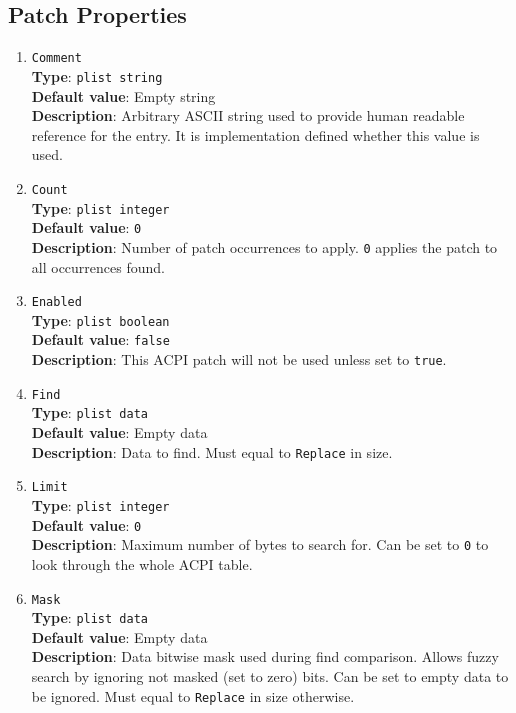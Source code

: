 \documentclass[]{article}
\begin{document}
\subsection{Patch Properties}\label{acpipropspatch}

\begin{enumerate}

\item
  \texttt{Comment}\\
  \textbf{Type}: \texttt{plist\ string}\\
  \textbf{Default value}: Empty string\\
  \textbf{Description}: Arbitrary ASCII string used to provide human readable
  reference for the entry. It is implementation defined whether this value is
  used.

\item
  \texttt{Count}\\
  \textbf{Type}: \texttt{plist\ integer}\\
  \textbf{Default value}: \texttt{0}\\
  \textbf{Description}: Number of patch occurrences to apply. \texttt{0} applies
  the patch to all occurrences found.

\item
  \texttt{Enabled}\\
  \textbf{Type}: \texttt{plist\ boolean}\\
  \textbf{Default value}: \texttt{false}\\
  \textbf{Description}: This ACPI patch will not be used unless set to
  \texttt{true}.

\item
  \texttt{Find}\\
  \textbf{Type}: \texttt{plist\ data}\\
  \textbf{Default value}: Empty data\\
  \textbf{Description}: Data to find. Must equal to \texttt{Replace} in size.

\item
  \texttt{Limit}\\
  \textbf{Type}: \texttt{plist\ integer}\\
  \textbf{Default value}: \texttt{0}\\
  \textbf{Description}: Maximum number of bytes to search for. Can be set to
  \texttt{0} to look through the whole ACPI table.

\item
  \texttt{Mask}\\
  \textbf{Type}: \texttt{plist\ data}\\
  \textbf{Default value}: Empty data\\
  \textbf{Description}: Data bitwise mask used during find comparison.
  Allows fuzzy search by ignoring not masked (set to zero) bits. Can be
  set to empty data to be ignored. Must equal to \texttt{Replace} in size
  otherwise.


\end{enumerate}
\end{document}
